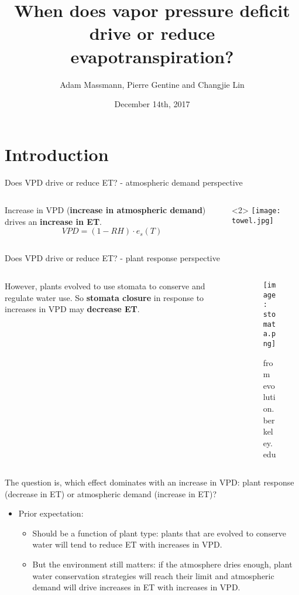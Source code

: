 \documentclass[aspectratio=169]{beamer}
\title[Your Short Title]{When does vapor pressure deficit drive or reduce evapotranspiration?}
\author{Adam Massmann,  Pierre Gentine and Changjie Lin}
\institute{AGU Fall Meeting}
\date{December 14th, 2017}
\begin{document}
\begin{frame}
  \titlepage
\end{frame}


\section{Introduction}


\begin{frame}{Does VPD drive or reduce ET? - atmospheric demand perspective}
  \begin{columns}
    \begin{column}{0.7\textwidth}
      Increase in VPD (\textbf{increase in atmospheric demand}) drives  an \textbf{increase in ET}.
      \[VPD = (1-RH)\cdot e_s (T)\]
    \end{column}
    \begin{column}{0.3\textwidth}<2>      
      \texttt{[image: towel.jpg]}
    \end{column}
  \end{columns}
\end{frame}

\begin{frame}{Does VPD drive or reduce ET? - plant response perspective}
  \begin{columns}
    \begin{column}{0.5\textwidth}
      However, plants evolved to use stomata to conserve and regulate water use. So \textbf{stomata closure} in response to increases in VPD may \textbf{decrease ET}.
    \end{column}
    \begin{column}{0.5\textwidth}
      \begin{figure}
        \texttt{[image: stomata.png]}%
        \caption{from evolution.berkeley.edu}
      \end{figure}
    \end{column}
  \end{columns}
\end{frame}


\begin{frame}{The question is, which effect dominates with an increase in VPD: plant response (decrease in ET) or atmospheric demand (increase in ET)?}
  \begin{itemize}
  \item Prior expectation:
    \begin{itemize}
    \item Should be a function of plant type: plants that are evolved to conserve water will tend to reduce ET with increases in VPD.
    \item But the environment still matters: if the atmosphere dries enough, plant water conservation strategies will reach their limit and atmospheric demand will drive increases in ET with increases in VPD.
    \end{itemize}
  \end{itemize}
\end{frame}
\end{document}
